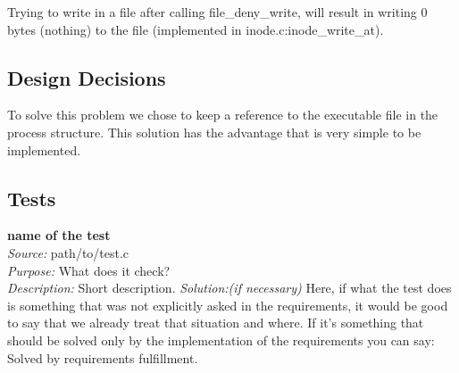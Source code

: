     Trying to write in a file after calling file\_deny\_write, will result in writing 0 bytes (nothing) to the file (implemented in inode.c:inode\_write\_at).

    \subsection{Design Decisions}

	To solve this problem we chose to keep a reference to the executable file in the process structure. This solution has the advantage that is very simple to be implemented.

    \subsection{Tests}

    \textbf{name of the test}\\
    \textit{Source:} path/to/test.c\\
    \textit{Purpose:} What does it check?\\
    \textit{Description:} Short description.
    \textit{Solution:(if necessary)} Here, if what the test does is something that was not explicitly asked in the requirements, it would be good to say that we already treat that situation and where. If it's something that should be solved only by the implementation of the requirements you can say: Solved by requirements fulfillment.
